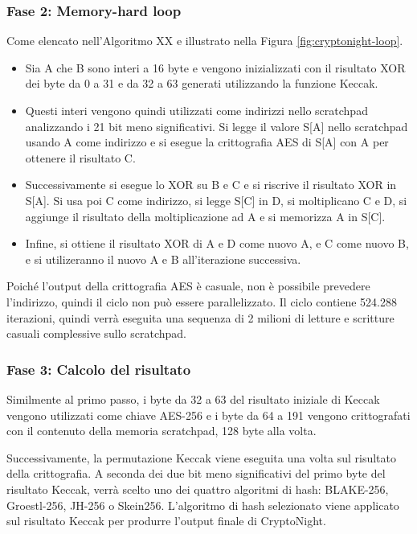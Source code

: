 \subsubsection*{Fase 2: Memory-hard loop}
Come elencato nell'Algoritmo XX e illustrato nella Figura \ref{fig:cryptonight-loop}. 
\begin{itemize}
    \item Sia A che B sono interi a 16 byte e vengono inizializzati con il risultato XOR dei byte da 0 a 31 e da 32 a 63 generati utilizzando la funzione Keccak. 
    \item Questi interi vengono quindi utilizzati come indirizzi nello scratchpad analizzando i 21 bit meno significativi. 
    Si legge il valore S[A] nello scratchpad usando A come indirizzo e si esegue la crittografia AES di S[A] con A per ottenere il risultato C. 
    \item Successivamente si esegue lo XOR su B e C e si riscrive il risultato XOR in S[A]. Si usa poi C come indirizzo, si legge S[C] in D, si moltiplicano C e D, si aggiunge il risultato della moltiplicazione ad A e si memorizza A in S[C].
    \item Infine, si ottiene il risultato XOR di A e D come nuovo A, e C come nuovo B, e si utilizeranno il nuovo A e B all'iterazione successiva. 
\end{itemize}



Poiché l'output della crittografia AES è casuale, non è possibile prevedere l'indirizzo, quindi il ciclo non può essere parallelizzato. Il ciclo contiene 524.288 iterazioni, quindi verrà eseguita una sequenza di 2 milioni di letture e scritture casuali complessive sullo scratchpad.

\subsubsection*{Fase 3: Calcolo del risultato} 
Similmente al primo passo, i byte da 32 a 63 del risultato iniziale di Keccak vengono utilizzati come chiave AES-256 e i byte da 64 a 191 vengono crittografati con il contenuto della memoria scratchpad, 128 byte alla volta. 

Successivamente, la permutazione Keccak viene eseguita una volta sul risultato della crittografia. A seconda dei due bit meno significativi del primo byte del risultato Keccak, verrà scelto uno dei quattro algoritmi di hash: BLAKE-256, Groestl-256, JH-256 o Skein256. L'algoritmo di hash selezionato viene applicato sul risultato Keccak per produrre l'output finale di CryptoNight.

